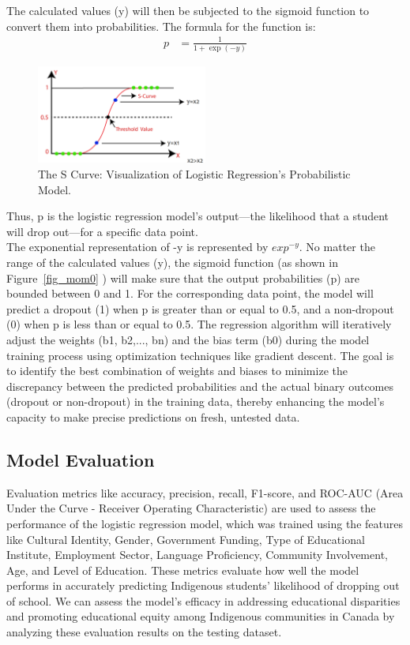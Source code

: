\documentclass[a4paper,twoside]{article}
\begin{document}
The calculated values (y) will then be subjected to the sigmoid function to convert them into probabilities. The formula for the function is:
\begin{align}
p &= \frac{1}{1 + \exp(-y)}
\end{align}

\begin{figure}[H]
    \centering 
    \includegraphics[width=0.5\textwidth, angle=0]{images/SGraph.png}	
    \captionsetup{format=plain, justification=centering}
    \caption{The S Curve: Visualization of Logistic Regression's Probabilistic Model.}
    \label{fig:fig_mom0}
\end{figure}

Thus, p is the logistic regression model's output—the likelihood that a student will drop out—for a specific data point.\\
The exponential representation of -y is represented by ${exp^{-y}}$.
No matter the range of the calculated values (y), the sigmoid function (as shown in Figure~\ref{fig_mom0} \cite{Essampally20}) will make sure that the output probabilities (p) are bounded between 0 and 1. For the corresponding data point, the model will predict a dropout (1) when p is greater than or equal to 0.5, and a non-dropout (0) when p is less than or equal to 0.5.
The regression algorithm will iteratively adjust the weights (b1, b2,..., bn) and the bias term (b0) during the model training process using optimization techniques like gradient descent. The goal is to identify the best combination of weights and biases to minimize the discrepancy between the predicted probabilities and the actual binary outcomes (dropout or non-dropout) in the training data, thereby enhancing the model's capacity to make precise predictions on fresh, untested data.

\subsection{Model Evaluation}
Evaluation metrics like accuracy, precision, recall, F1-score, and ROC-AUC (Area Under the Curve - Receiver Operating Characteristic) are used to assess the performance of the logistic regression model, which was trained using the features like Cultural Identity, Gender, Government Funding, Type of Educational Institute, Employment Sector, Language Proficiency, Community Involvement, Age, and Level of Education. These metrics evaluate how well the model performs in accurately predicting Indigenous students' likelihood of dropping out of school. We can assess the model's efficacy in addressing educational disparities and promoting educational equity among Indigenous communities in Canada by analyzing these evaluation results on the testing dataset.
\end{document}

